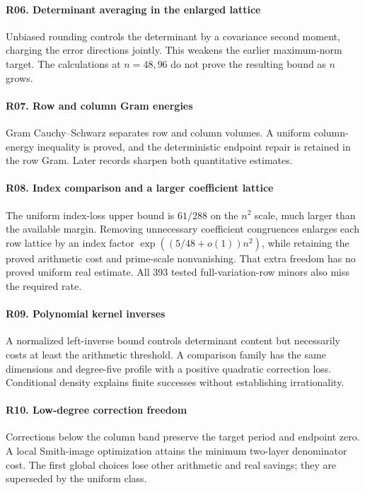 \paragraph{R06. Determinant averaging in the enlarged lattice}\label{record-R06}
Unbiased rounding controls the determinant by a covariance second moment, charging the error directions jointly. This weakens the earlier maximum-norm target. The calculations at $n=48,96$ do not prove the resulting bound as $n$ grows.

\paragraph{R07. Row and column Gram energies}\label{record-R07}
Gram Cauchy--Schwarz separates row and column volumes. A uniform column-energy inequality is proved, and the deterministic endpoint repair is retained in the row Gram. Later records sharpen both quantitative estimates.

\paragraph{R08. Index comparison and a larger coefficient lattice}\label{record-R08}
The uniform index-loss upper bound is $61/288$ on the $n^2$ scale, much larger than the available margin. Removing unnecessary coefficient congruences enlarges each row lattice by an index factor $\exp((5/48+o(1))n^2)$, while retaining the proved arithmetic cost and prime-scale nonvanishing. That extra freedom has no proved uniform real estimate. All 393 tested full-variation-row minors also miss the required rate.

\paragraph{R09. Polynomial kernel inverses}\label{record-R09}
A normalized left-inverse bound controls determinant content but necessarily costs at least the arithmetic threshold. A comparison family has the same dimensions and degree-five profile with a positive quadratic correction loss. Conditional density explains finite successes without establishing irrationality.

\paragraph{R10. Low-degree correction freedom}\label{record-R10}
Corrections below the column band preserve the target period and endpoint zero. A local Smith-image optimization attains the minimum two-layer denominator cost. The first global choices lose other arithmetic and real savings; they are superseded by the uniform class.

